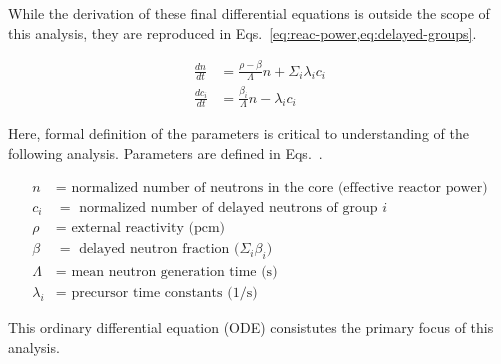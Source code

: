 \documentclass[review,onefignum,onetabnum]{siamart171218}
\begin{document}
While the derivation of these final differential equations is outside the scope
of this analysis, they are reproduced in Eqs.~\cref{eq:reac-power,eq:delayed-groups}.

\begin{align}
  \label{eq:reac-power}
  \frac{dn}{dt} &= \frac{\rho - \beta}{\Lambda}n + \Sigma_i\lambda_i c_i \\
  \label{eq:delayed-groups}
  \frac{dc_i}{dt} &= \frac{\beta_i}{\Lambda}n - \lambda_i c_i
\end{align}

Here, formal definition of the parameters is critical to understanding of the
following analysis. Parameters are defined in Eqs.~.

\begin{align}
  \label{eq:param_1}
  n &= \text{ normalized number of neutrons in the core (effective reactor power)} \\
  \label{eq:param_2}
  c_i &= \text{ normalized number of delayed neutrons of group $i$} \\
  \label{eq:param_3}
  \rho &= \text{ external reactivity (pcm) } \\
  \label{eq:param_4}
  \beta &= \text{ delayed neutron fraction ($\Sigma_i \beta_i$) } \\
  \label{eq:param_5}
  \Lambda &= \text{ mean neutron generation time (s)} \\
  \label{eq:param_6}
  \lambda_i &= \text{ precursor time constants (1/s)}
\end{align}

This ordinary differential equation (ODE) consistutes the primary focus of this
analysis.
\end{document}
